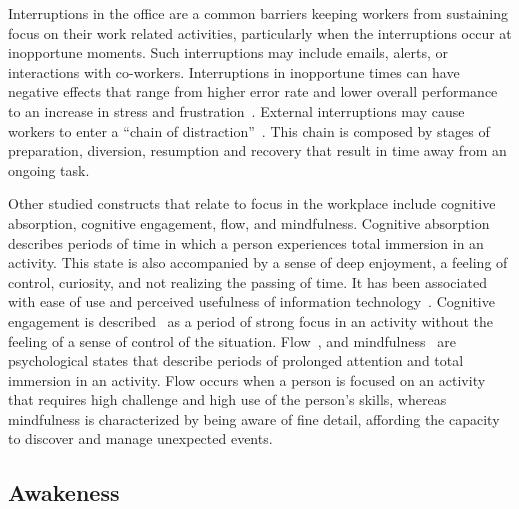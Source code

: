 Interruptions in the office are a common barriers keeping workers from sustaining focus on their work related activities, particularly when the interruptions occur at inopportune moments.
Such interruptions may include emails, alerts, or interactions with co-workers\cite{gonzalez2004constant,chong2006interruptions,shamsi07}. Interruptions in inopportune times can have negative effects that range from higher error rate and lower overall performance
to an increase in stress and frustration~\cite{bailey2001effects,czerwinski2000instant,mark2008cost}.
External interruptions may cause workers to enter a ``chain of distraction''~\cite{shamsi07}.
This chain is composed by stages of preparation, diversion, resumption and recovery that result in time away from an ongoing task. 


Other studied constructs that relate to focus in the workplace include cognitive absorption, cognitive engagement, flow, and mindfulness.
Cognitive absorption describes periods of time in which a person experiences total immersion in an activity.
This state is also accompanied by a sense of deep enjoyment, a feeling of control, curiosity, and not realizing the passing of time.
It has been associated with ease of use and perceived usefulness of information technology~\cite{agarwal00}.
Cognitive engagement is described~\cite{webster97} as a period of strong focus in an activity without the feeling of a sense of control of the situation.
Flow~\cite{Csikszentmihalyi90}, and mindfulness~\cite{Weick06,dane11} are psychological states that describe periods of prolonged attention and total immersion in an activity. Flow occurs when a person is focused on an activity that requires high challenge and high use of the person's skills, whereas mindfulness is characterized by being aware of fine detail, affording the capacity to discover and manage unexpected events.

\subsection{Awakeness}


